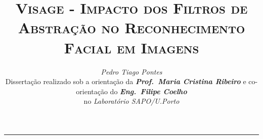 \documentclass[9pt,a4paper]{extarticle}
\begin{document}
\title{\vspace*{-8mm}\textbf{\textsc{Visage - Impacto dos Filtros de Abstração no Reconhecimento Facial em Imagens}}}
\author{\emph{Pedro Tiago Pontes}\\[2mm]
\small{Dissertação realizado sob a orientação da \textbf{\emph{Prof.\ Maria Cristina Ribeiro}} e co-orientação do \textbf{\emph{Eng.\ Filipe Coelho}}}\\
\small{no \emph{Laboratório SAPO/U.Porto}}}
\date{}
\maketitle
\thispagestyle{empty}

\vspace*{-4mm}\noindent\rule{\textwidth}{0.4pt}\vspace*{4mm}
\end{document}
